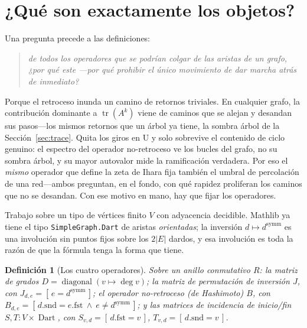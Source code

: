 \documentclass[11pt]{article}
\newtheorem{definition}{Definici\'on}
\newcommand{\lean}[1]{\texttt{#1}}
\DeclareMathOperator{\Dart}{Dart}
\begin{document}


\section{¿Qu\'e son exactamente los objetos?}
\label{sec:setting}

Una pregunta precede a las definiciones:
\begin{quote}\itshape
  de todos los operadores que se podr\'ian colgar de las aristas de un grafo, ¿por qu\'e \emph{este}
  ---por qu\'e prohibir el \'unico movimiento de dar marcha atr\'as de inmediato?
\end{quote}
Porque el retroceso inunda un camino de retornos triviales. En cualquier grafo, la contribuci\'on
dominante a $\operatorname{tr}(A^k)$ viene de caminos que se alejan y desandan sus pasos---los mismos
retornos que un \'arbol ya tiene, la sombra \'arbol de la Secci\'on~\ref{sec:trace}. Quita los giros
en U y solo sobrevive el contenido de ciclo genuino: el espectro del operador no-retroceso ve los
bucles del grafo, no su sombra \'arbol, y su mayor autovalor mide la ramificaci\'on verdadera. Por
eso el \emph{mismo} operador que define la zeta de Ihara fija tambi\'en el umbral de percolaci\'on de
una red---ambos preguntan, en el fondo, con qu\'e rapidez proliferan los caminos que no se
desandan. Con ese motivo en mano, hay que fijar los operadores.

Trabajo sobre un tipo de v\'ertices finito $V$ con adyacencia decidible. Mathlib ya tiene el tipo
\lean{SimpleGraph.Dart} de aristas \emph{orientadas}; la inversi\'on $d\mapsto d^{\mathrm{symm}}$ es
una involuci\'on sin puntos fijos sobre los $2|E|$ dardos, y esa involuci\'on es toda la raz\'on de
que la f\'ormula tenga la forma que tiene.

\begin{definition}[Los cuatro operadores]
Sobre un anillo conmutativo $R$: la \emph{matriz de grados}
$D=\operatorname{diagonal}(v\mapsto\deg v)$; la matriz de permutaci\'on de \emph{inversi\'on} $J$, con
$J_{d,e}=[\,e=d^{\mathrm{symm}}\,]$; el operador \emph{no-retroceso} (de Hashimoto) $B$, con
$B_{d,e}=[\,d.\mathrm{snd}=e.\mathrm{fst}\ \wedge\ e\neq d^{\mathrm{symm}}\,]$; y las matrices de
incidencia de inicio/fin $S,T\colon V\times\Dart$, con $S_{v,d}=[\,d.\mathrm{fst}=v\,]$,
$T_{v,d}=[\,d.\mathrm{snd}=v\,]$.
\end{definition}
\end{document}
